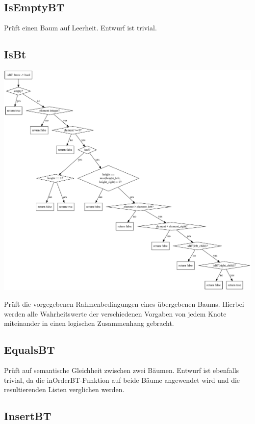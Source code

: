 \documentclass[11pt]{article}
\begin{document}
    \subsection{IsEmptyBT}
    Prüft einen Baum auf Leerheit. Entwurf ist trivial.
    \subsection{IsBt}

    \begin{center}
        \includegraphics[width=1.2\columnwidth] {isBt}
    \end{center}

    Prüft die vorgegebenen Rahmenbedingungen eines übergebenen
    Baums. Hierbei werden alle Wahrheitswerte der verschiedenen
    Vorgaben von jedem Knote miteinander in einen logischen
    Zusammenhang gebracht.
    \subsection{EqualsBT}
    Prüft auf semantische Gleichheit zwischen zwei Bäumen.
    Entwurf ist ebenfalls trivial, da die inOrderBT-Funktion
    auf beide Bäume angewendet wird und die resultierenden Listen verglichen werden.
    \subsection{InsertBT}
\end{document}
